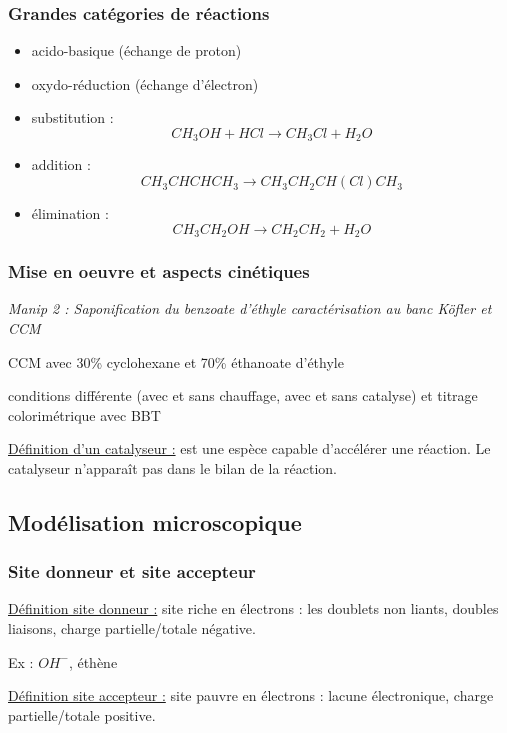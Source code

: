 \documentclass{article}%
\begin{document}
\subsubsection{Grandes catégories de réactions}

\begin{itemize}
	\item acido-basique (échange de proton)

	\item oxydo-réduction (échange d'électron)

	\item substitution : \[CH_3OH +HCl \rightarrow CH_3Cl+H_2O\]

	\item addition : \[CH_3CHCHCH_3 \rightarrow CH_3CH_2CH(Cl)CH_3\]

	\item élimination : \[CH_3CH_2OH\rightarrow CH_2CH_2+H_2O\]
\end{itemize}
\subsubsection{Mise en oeuvre et aspects cinétiques}

\textit{Manip 2 : Saponification du benzoate d’éthyle caractérisation au banc Köfler et CCM}

CCM avec 30\% cyclohexane et 70\% éthanoate d'éthyle

conditions différente (avec et sans chauffage, avec et sans catalyse) et titrage colorimétrique avec BBT 

\underline{Définition d'un catalyseur :} est une espèce capable d’accélérer une réaction. Le catalyseur n’apparaît pas dans le bilan de la réaction.

\subsection{Modélisation microscopique}

\subsubsection{Site donneur et site accepteur}

\underline{Définition site donneur :} site riche en électrons : les doublets non liants, doubles liaisons, charge partielle/totale négative.

Ex : $OH^-$, éthène

\underline{Définition site accepteur :} site pauvre en électrons : lacune électronique, charge partielle/totale positive.
\end{document}
